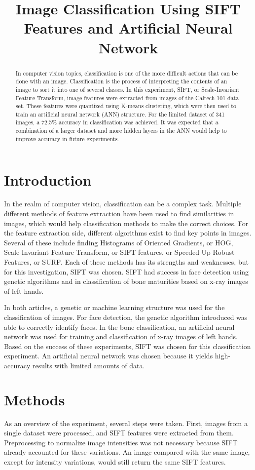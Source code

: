 \documentclass{article}
\title{Image Classification Using SIFT Features and Artificial Neural Network}
\begin{document}
%
\maketitle
%
\begin{abstract}
In computer vision topics, classification is one of the more difficult actions that can be done with an image. Classification is the process of interpreting the contents of an image to sort it into one of several classes. In this experiment, SIFT, or Scale-Invariant Feature Transform, image features were extracted from images of the Caltech 101 data set. These features were quantized using K-means clustering, which were then used to train an artificial neural network (ANN) structure. For the limited dataset of 341 images, a 72.5\% accuracy in classification was achieved. It was expected that a combination of a larger dataset and more hidden layers in the ANN would help to improve accuracy in future experiments.
\end{abstract}
%
\section{Introduction}
\label{sec:intro}
In the realm of computer vision, classification can be a complex task. Multiple different methods of feature extraction have been used to find similarities in images, which would help classification methods to make the correct choices. For the feature extraction side, different algorithms exist to find key points in images. Several of these include finding Histograms of Oriented Gradients, or HOG, Scale-Invariant Feature Transform, or SIFT features, or Speeded Up Robust Features, or SURF. Each of these methods has its strengths and weaknesses, but for this investigation, SIFT was chosen. SIFT had success in face detection using genetic algorithms\cite{faces} and in classification of bone maturities based on x-ray images of left hands\cite{bones}.

In both articles, a genetic or machine learning structure was used for the classification of images. For face detection, the genetic algorithm introduced was able to correctly identify faces\cite{faces}. In the bone classification, an artificial neural network was used for training and classification of x-ray images of left hands\cite{bones}. Based on the success of these experiments, SIFT was chosen for this classification experiment. An artificial neural network was chosen because it yields high-accuracy results with limited amounts of data\cite{bones}.
%
\section{Methods}
\label{sec:methods}
As an overview of the experiment, several steps were taken. First, images from a single dataset were processed, and SIFT features were extracted from them. Preprocessing to normalize image intensities was not necessary because SIFT already accounted for these variations. An image compared with the same image, except for intensity variations, would still return the same SIFT features.
\end{document}
